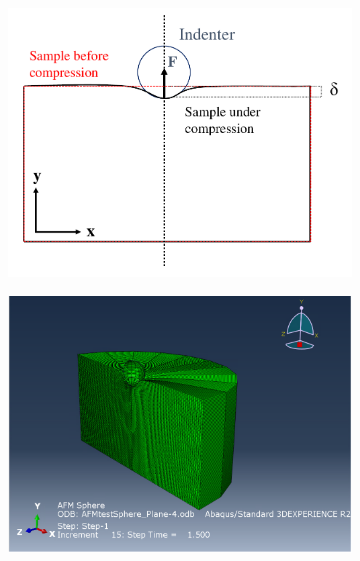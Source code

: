 \begin{figure}[H]
\centering
    \begin{subfigure}[t]{0.45\textwidth}
        \centering
        \caption{\label{fig: Hertz Contact Illustration}}
        \includegraphics[width=1\linewidth]{Figures/Hertz Contact.pdf}  
    \end{subfigure}
    \hfill
    \begin{subfigure}[t]{0.45\textwidth}
        \centering
        \caption{\label{fig: Sphere-Plane_Result}}
        \includegraphics[width=1\linewidth]{Figures/Sphere-Plane_Result.png}        
    \end{subfigure}
    

\end{figure}
